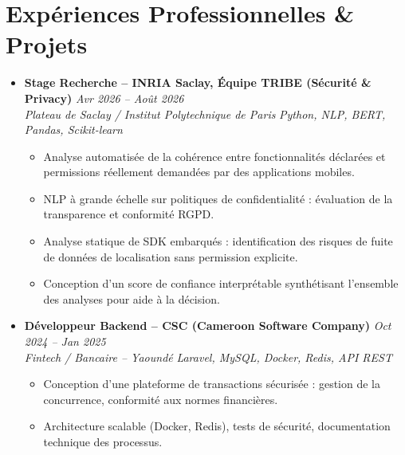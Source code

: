 \documentclass[a4paper,11pt]{article}
\begin{document}
\section{Expériences Professionnelles \& Projets}
\begin{itemize}[leftmargin=*, label={-}]

\item \textbf{Stage Recherche -- INRIA Saclay, Équipe TRIBE (Sécurité \& Privacy)} \hfill \textit{Avr 2026 -- Août 2026} \\
\textit{Plateau de Saclay / Institut Polytechnique de Paris} \hfill \textit{Python, NLP, BERT, Pandas, Scikit-learn}
\vspace{-2pt}
    \begin{itemize}[leftmargin=0.4cm, nosep, label=\tiny$\bullet$]
        \item \small{Analyse automatisée de la cohérence entre fonctionnalités déclarées et permissions réellement demandées par des applications mobiles.}
        \item \small{NLP à grande échelle sur politiques de confidentialité : évaluation de la transparence et conformité RGPD.}
        \item \small{Analyse statique de SDK embarqués : identification des risques de fuite de données de localisation sans permission explicite.}
        \item \small{Conception d'un score de confiance interprétable synthétisant l'ensemble des analyses pour aide à la décision.}
    \end{itemize}
\vspace{3pt}

\item \textbf{Développeur Backend -- CSC (Cameroon Software Company)} \hfill \textit{Oct 2024 -- Jan 2025} \\
\textit{Fintech / Bancaire -- Yaoundé} \hfill \textit{Laravel, MySQL, Docker, Redis, API REST}
\vspace{-2pt}
    \begin{itemize}[leftmargin=0.4cm, nosep, label=\tiny$\bullet$]
        \item \small{Conception d'une plateforme de transactions sécurisée : gestion de la concurrence, conformité aux normes financières.}
        \item \small{Architecture scalable (Docker, Redis), tests de sécurité, documentation technique des processus.}
    \end{itemize}
\vspace{3pt}


\end{itemize}
\end{document}
